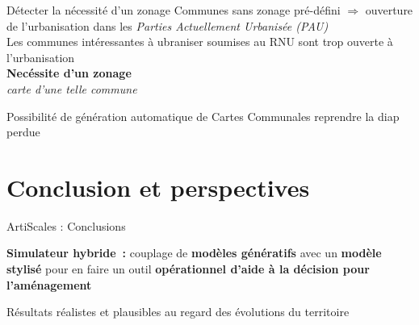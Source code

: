 \documentclass[xcolor=table]{beamer}
\begin{document}
\begin{frame}{Détecter la nécessité d'un zonage}
	Communes sans zonage pré-défini $\Longrightarrow$ ouverture de l'urbanisation dans les \textit{Parties Actuellement Urbanisée (PAU)}
	\\
	Les communes intéressantes à ubraniser soumises au RNU sont trop ouverte à l'urbanisation 
	\\
	\textbf{Necéssite d'un \textbf{zonage}}
	\\ %
	\textit{carte d'une telle commune}
\end{frame}

\begin{frame}{Possibilité de génération automatique de Cartes Communales}
reprendre la diap perdue
\end{frame}




\section{Conclusion et perspectives}




\begin{frame}{ArtiScales : Conclusions}
	\begin{block}{}
		\textbf{Simulateur hybride~:} couplage de \textbf{modèles génératifs} avec un \textbf{modèle stylisé} pour en faire un outil \textbf{opérationnel d'aide à la décision pour l'aménagement}
	\end{block}
	\begin{block}{}
		Résultats réalistes et plausibles au regard des évolutions du territoire
	\end{block}
\end{frame}
\end{document}
